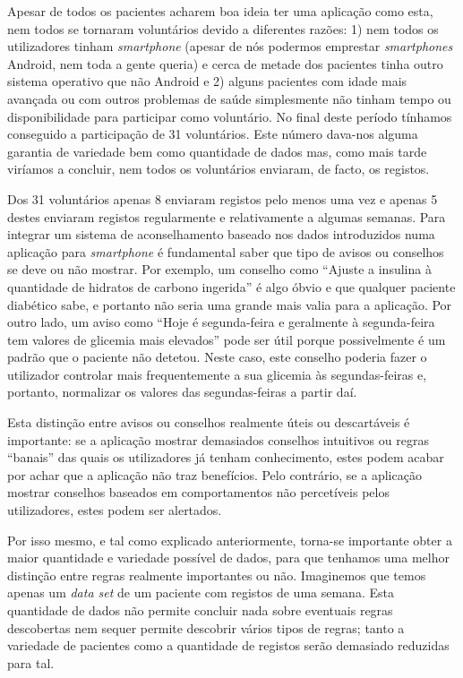 Apesar de todos os pacientes acharem boa ideia ter uma aplicação como esta, nem todos se tornaram voluntários devido a diferentes razões: 1) nem todos os utilizadores tinham \textit{smartphone} (apesar de nós podermos emprestar \textit{smartphones} Android, nem toda a gente queria) e cerca de metade dos pacientes tinha outro sistema operativo que não Android e 2) alguns pacientes com idade mais avançada ou com outros problemas de saúde simplesmente não tinham tempo ou disponibilidade para participar como voluntário. 
No final deste período tínhamos conseguido a participação de 31 voluntários. Este número dava-nos alguma garantia de variedade bem como quantidade de dados mas, como mais tarde viríamos a concluir, nem todos os voluntários enviaram, de facto, os registos.

Dos 31 voluntários apenas 8 enviaram registos pelo menos uma vez e apenas 5 destes enviaram registos regularmente e relativamente a algumas semanas. Para integrar um sistema de aconselhamento baseado nos dados introduzidos numa aplicação para \textit{smartphone} é fundamental saber que tipo de avisos ou conselhos se deve ou não mostrar. Por exemplo, um conselho como ``Ajuste a insulina à quantidade de hidratos de carbono ingerida'' é algo óbvio e que qualquer paciente diabético sabe, e portanto não seria uma grande mais valia para a aplicação. Por outro lado, um aviso como ``Hoje é segunda-feira e geralmente à segunda-feira tem valores de glicemia mais elevados'' pode ser útil porque possivelmente é um padrão que o paciente não detetou. Neste caso, este conselho poderia fazer o utilizador controlar mais frequentemente a sua glicemia às segundas-feiras e, portanto, normalizar os valores das segundas-feiras a partir daí. 

Esta distinção entre avisos ou conselhos realmente úteis ou descartáveis é importante: se a aplicação mostrar demasiados conselhos intuitivos ou regras ``banais'' das quais os utilizadores já tenham conhecimento, estes podem acabar por achar que a aplicação não traz benefícios. Pelo contrário, se a aplicação mostrar conselhos baseados em comportamentos não percetíveis pelos utilizadores, estes podem ser alertados. 

Por isso mesmo, e tal como explicado anteriormente, torna-se importante obter a maior quantidade e variedade possível de dados, para que tenhamos uma melhor distinção entre regras realmente importantes ou não. Imaginemos que temos apenas um \textit{data set} de um paciente com registos de uma semana. Esta quantidade de dados não permite concluir nada sobre eventuais regras descobertas nem sequer permite descobrir vários tipos de regras; tanto a variedade de pacientes como a quantidade de registos serão demasiado reduzidas para tal. 

